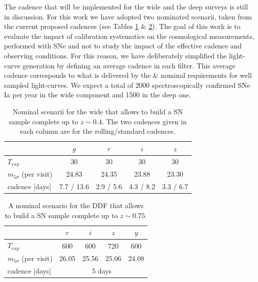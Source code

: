 \documentclass[\docopts]{\docclass}
\begin{document}
The cadence that will be implemented for the wide and the deep surveys is still in discussion.
For this work we have adopted two nominated scenarii, taken from the current proposed cadences (see Tables \ref{tab:nominal_scenario_wide} \& \ref{tab:nominal_scenario_DDF}).
The goal of this work is to evaluate the impact of calibration systematics on the cosmological measurements, performed with SNe and not to study the impact of the effective cadence and observing conditions.
For this reason, we have deliberately simplified the light-curve generation by defining an average cadence in each filter.
This average cadence corresponds to what is delivered by the  \&  nominal requirements for well sampled light-curves. We expect a total of 2000 spectroscopically confirmed SNe Ia per year in the wide component and 1500 in the deep one.

\begin{table}[t]
\begin{center}
  \caption{Nominal scenarii for the wide that allows to build a SN
    sample complete up to $z \sim 0.4$. The two cadences given in each
    column are for the rolling/standard cadences.}
\label{tab:nominal_scenario_wide}
\begin{tabular}{l|cccc}
\hline
\hline
              & $g$ & $r$ & $i$ & $z$ \\
\hline 
$T_{exp}$      & 30       &   30    &  30        & 30  \\
$m_{5\sigma}$ (per visit)  &  24.83   &  24.35   &  23.88    &  23.30  \\
cadence [days]       & 7.7 / 13.6 & 2.9 / 5.6 & 4.3 / 8.2 & 3.3 / 6.7  \\
\hline
\end{tabular}
\end{center}
\end{table}

\begin{table}[t]
\begin{center}
\caption{A nominal scenario for the DDF that allows to build a SN
  sample complete up to $z \sim 0.75$.}
\label{tab:nominal_scenario_DDF}
\begin{tabular}{l|cccc}
\hline
\hline
              & $r$ & $i$ & $z$ & $y$ \\
\hline 
$T_{exp}$      & 600 & 600 & 720 & 600 \\
$m_{5\sigma}$ (per visit)  & 26.05 & 25.56 & 25.06 & 24.08 \\
cadence  [days]     &  \multicolumn{4}{c}{5 days} \\
\hline
\end{tabular}
\end{center}
\end{table}
\end{document}

